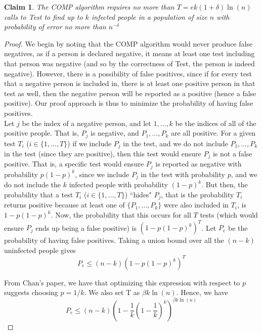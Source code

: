 \documentclass[12pt]{article}
\newtheorem{claim}[theorem]{Claim}
\begin{document}
\begin{claim}

The COMP algorithm requires no more than $T=ek(1+\delta)\ln(n)$ calls to {\sf Test} to find up to $k$ infected people in a population of size $n$ with probability of error no more than $n^{-\delta}$

\end{claim}

\begin{proof}
We begin by noting that the COMP algorithm would never produce false negatives, as if a person is declared negative, it means at least one test including that person was negative (and so by the correctness of {\sf Test}, the person is indeed negative). However, there is a possibility of false positives, since if for every test that a negative person is included in, there is at least one positive person in that test as well, then the negative person will be reported as a positive (hence a false positive). Our proof approach is thus to minimize the probability of having false positives. \\
Let $j$ be the index of a negative person, and let $1,...,k$ be the indices of all of the positive people. That is, $P_j$ is negative, and $P_1,...,P_k$ are all positive. For a given test $T_i$ ($i \in \{1,...,T\}$) if we include $P_j$ in the test, and we do not include $P_1,...,P_k$ in the test (since they are positive), then this test would ensure $P_j$ is not a false positive. That is, a specific test would ensure $P_j$ is reported as negative with probability $p(1-p)^k$, since we include $P_j$ in the test with probability $p$, and we do not include the $k$ infected people with probability $(1-p)^k$. But then, the probability that a test $T_i$ ($i \in \{1,...,T\}$) ``hides" $P_j$, that is the probability $T_i$ returns positive because at least one of $\{P_1,...,P_k\}$ were also included in $T_i$, is $1-p(1-p)^k$. Now, the probability that this occurs for all $T$ tests (which would ensure $P_j$ ends up being a false positive) is $(1-p(1-p)^k)^T$. Let $P_e$ be the probability of having false positives. Taking a union bound over all the $(n-k)$ uninfected people gives $$P_e \leq (n-k)(1-p(1-p)^k)^T $$

From Chan's paper, we have that optimizing this expression with respect to $p$ suggests choosing $p=1/k$. We also set T as $\beta k \ln (n)$. Hence, we have
$$P_e \leq (n-k)(1-\frac{1}{k}(1-\frac{1}{k})^k)^{\beta k \ln (n)} $$


\end{proof}
\end{document}
